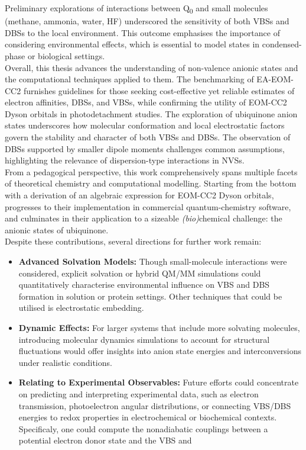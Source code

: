 Preliminary explorations of interactions between Q\textsubscript{0} and small molecules (methane, ammonia, water, HF) underscored the sensitivity of both VBSs and DBSs to the local environment. This outcome emphasises the importance of considering environmental effects, which is essential to model states in condensed-phase or biological settings.\\

Overall, this thesis advances the understanding of non-valence anionic states and the computational techniques applied to them. The benchmarking of EA-EOM-CC2 furnishes guidelines for those seeking cost-effective yet reliable estimates of electron affinities, DBSs, and VBSs, while confirming the utility of EOM-CC2 Dyson orbitals in photodetachment studies. The exploration of ubiquinone anion states underscores how molecular conformation and local electrostatic factors govern the stability and character of both VBSs and DBSs. The observation of DBSs supported by smaller dipole moments challenges common assumptions, highlighting the relevance of dispersion-type interactions in NVSs.\\

From a pedagogical perspective, this work comprehensively spans multiple facets of theoretical chemistry and computational modelling. Starting from the bottom with a derivation of an algebraic expression for EOM-CC2 Dyson orbitals, progresses to their implementation in commercial quantum-chemistry software, and culminates in their application to a sizeable \textit{(bio)}chemical challenge: the anionic states of ubiquinone.\\

Despite these contributions, several directions for further work remain:
\begin{itemize}
    \item \textbf{Advanced Solvation Models:} Though small-molecule interactions were considered, explicit solvation or hybrid QM/MM simulations could quantitatively characterise environmental influence on VBS and DBS formation in solution or protein settings. Other techniques that could be utilised is electrostatic embedding.
    \item \textbf{Dynamic Effects:} For larger systems that include more solvating molecules, introducing molecular dynamics simulations to account for structural fluctuations would offer insights into anion state energies and interconversions under realistic conditions.
    \item \textbf{Relating to Experimental Observables:} Future efforts could concentrate on predicting and interpreting experimental data, such as electron transmission, photoelectron angular distributions, or connecting VBS/DBS energies to redox properties in electrochemical or biochemical contexts. Specificaly, one could compute the nonadiabatic couplings between a potential electron donor state and the VBS and
\end{itemize}
    
